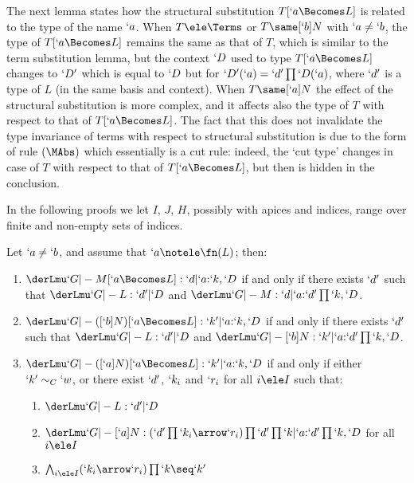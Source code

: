 \documentclass{CSML}
\begin{document}
\noindent The next lemma states how the structural substitution $T[`a\Becomes L]$ is related to the type of the name $`a$. 
When $T\ele \Terms$ or $T\same [`b]N$ with $`a \neq `b$, the type of $T[`a\Becomes L]$ remains the same as that of $T$, which is similar to the term substitution lemma, but the context $`D $ used to type $T[`a\Becomes L]$ changes to $`D'$ which is equal to $`D $ but for $`D'(`a) = `d'\prod`D(`a)$, where $`d'$ is a type of $L$ (in the same basis and context). 
When $T\same [`a]N$ the effect of the structural substitution is more complex, and it affects also the type of $T$ with respect to that of $T[`a\Becomes L]$. 
The fact that this does not invalidate the type invariance of terms with respect to structural substitution is due to the form of rule $(\MAbs)$ which essentially is a cut rule: indeed, the `cut type' changes in case of $T$ with respect to that of $T[`a\Becomes L]$, but then is hidden in the conclusion.

In the following proofs we let $I$, $J$, $H$, possibly with apices and indices, range over finite and non-empty sets of indices.


 \begin{lem}  \label{structural substitution lemma}
Let %
$`a \neq `b$, and assume that $`a \notele \fn(L)$; then:
 \begin{enumerate}

 \item \label{structural substitution lemma i}
$\derLmu `G |- {M[`a\Becomes L]} : `d | `a{:}`k,`D $ if and only if there exists $`d'$ such that $ \derLmu `G |- L : `d' | `D $ and $\derLmu `G |- M : `d | `a{:}`d'\prod`k,`D $.

 \item \label{structural substitution lemma ii}
$ \derLmu `G |- {([`b]N)[`a\Becomes L]} : `k' | `a{:}`k,`D $ if and only if there exists $`d'$ such that $ \derLmu `G |- L : `d' | `D $ and $\derLmu `G |- [`b]N : `k' | `a{:}`d'\prod`k,`D $.

 \item \label{structural substitution lemma iii}
 $\derLmu `G |- {([`a]N)[`a\Becomes L]} : `k' | `a{:}`k,`D $ if and only if either $`k' \sim_C `w$, or
there exist $`d'$, 
 $`k_i$ and $`r_i$ for all $i\ele I$ such that:
 \begin{enumerate}
 \item $\derLmu `G |- L : `d' | `D $
 \item $\derLmu `G |- {[`a]N}: (`d'\prod `k_i\arrow `r_i)\prod `d'\prod `k | `a{:}`d'\prod `k,`D $ for all $i\ele I$
 \item $\bigwedge_{i \ele I}(`k_i\arrow `r_i)\prod `k \seq `k'$
 \end{enumerate}

 \end{enumerate}
 \end{lem}
\end{document}
